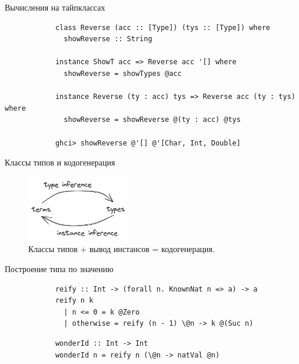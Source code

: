     \begin{frame}[fragile]{Вычисления на тайпклассах}
        \pause
        \begin{verbatim}
            class Reverse (acc :: [Type]) (tys :: [Type]) where
              showReverse :: String

            instance ShowT acc => Reverse acc '[] where
              showReverse = showTypes @acc

            instance Reverse (ty : acc) tys => Reverse acc (ty : tys) where
              showReverse = showReverse @(ty : acc) @tys

            ghci> showReverse @'[] @'[Char, Int, Double]
        \end{verbatim}
    \end{frame}

    \begin{frame}[fragile]{Классы типов и кодогенерация}
        \begin{figure}[h]
            \centering
            \includegraphics[width=0.4\textwidth]{figs/class-sinergy}
            \caption{Классы типов + вывод инстансов = кодогенерация.}
            \label{fig:class-sinergy}
        \end{figure}
    \end{frame}

    \begin{frame}[fragile]{Построение типа по значению}
        \pause
        \begin{verbatim}
            reify :: Int -> (forall n. KnownNat n => a) -> a
            reify n k
              | n <= 0 = k @Zero
              | otherwise = reify (n - 1) \@n -> k @(Suc n)
        \end{verbatim}
        \pause\vspace{1em}
        \begin{verbatim}
            wonderId :: Int -> Int
            wonderId n = reify n (\@n -> natVal @n)
        \end{verbatim}
    \end{frame}

